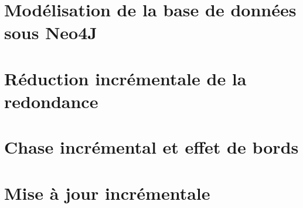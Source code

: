 \section{Modélisation de la base de données sous Neo4J}
\label{sec:update:db}


\section{Réduction incrémentale de la redondance}
\label{sec:update:simplify}


\section{Chase incrémental et effet de bords}
\label{sec:update:chase}


\section{Mise à jour incrémentale}
\label{sec:update:update}

